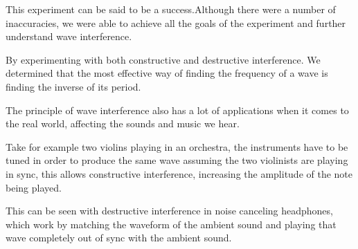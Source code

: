 

{This experiment can be said to be a success.Although there were a number of inaccuracies, we were able to achieve all the goals of the experiment and further understand wave interference.}

{By experimenting with both constructive and destructive interference. We determined that the most effective way of finding the frequency of a wave is finding the inverse of its period.}

{The principle of wave interference also has a lot of applications when it comes to the real world, affecting the sounds and music we hear.}

{Take for example two violins playing in an orchestra, the instruments have to be tuned in order to produce the same wave assuming the two violinists are playing in sync, this allows constructive interference, increasing the amplitude of the note being played.}

{This can be seen with destructive interference in noise canceling headphones, which work by matching the waveform of the ambient sound and playing that wave completely out of sync with the ambient sound.}


